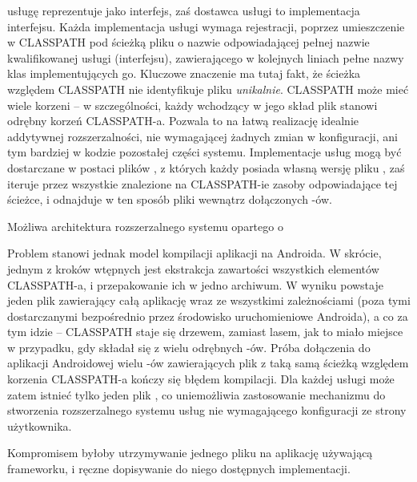  usługę reprezentuje jako interfejs, zaś dostawca usługi to implementacja
interfejsu. Każda implementacja usługi wymaga rejestracji, poprzez umieszczenie w CLASSPATH pod
ścieżką  pliku o nazwie odpowiadającej pełnej nazwie kwalifikowanej usługi
(interfejsu), zawierającego w kolejnych liniach pełne nazwy klas implementujących go. Kluczowe
znaczenie ma tutaj fakt, że ścieżka względem CLASSPATH nie identyfikuje pliku \emph{unikalnie}.
CLASSPATH może mieć wiele korzeni -- w szczególności, każdy wchodzący w jego skład plik 
stanowi odrębny korzeń CLASSPATH-a. Pozwala to na łatwą realizację idealnie addytywnej
rozszerzalności, nie wymagającej żadnych zmian w konfiguracji, ani tym bardziej w kodzie pozostałej
części systemu. Implementacje usług mogą być dostarczane w postaci plików , z których
każdy posiada własną wersję pliku , zaś
 iteruje przez wszystkie znalezione na CLASSPATH-ie zasoby odpowiadające tej
ścieżce, i odnajduje w ten sposób pliki wewnątrz dołączonych -ów.

{Możliwa architektura rozszerzalnego systemu opartego o }


Problem stanowi jednak model kompilacji aplikacji na Androida. W skrócie, jednym z kroków wtępnych
jest ekstrakcja zawartości wszystkich elementów CLASSPATH-a, i przepakowanie ich w jedno archiwum. W
wyniku powstaje jeden plik  zawierający całą aplikację wraz ze wszystkimi zależnościami
(poza tymi dostarczanymi bezpośrednio przez środowisko uruchomieniowe Androida), a co za tym idzie
-- CLASSPATH staje się drzewem, zamiast lasem, jak to miało miejsce w przypadku, gdy składał się z
wielu odrębnych -ów. Próba dołączenia do aplikacji Androidowej wielu -ów
zawierających plik z taką samą ścieżką względem korzenia CLASSPATH-a kończy się błędem kompilacji.
Dla każdej usługi może zatem istnieć tylko jeden plik ,
co uniemożliwia zastosowanie mechanizmu  do stworzenia rozszerzalnego systemu
usług nie wymagającego konfiguracji ze strony użytkownika.

\begin{Note}
  Kompromisem byłoby utrzymywanie jednego pliku  na
  aplikację używającą frameworku, i ręczne dopisywanie do niego dostępnych implementacji.
\end{Note}

